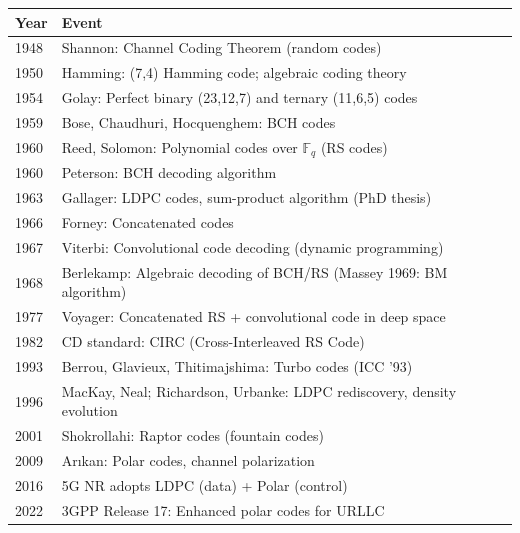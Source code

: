 \begin{tabularx}{\linewidth}{|l|X|}
\hline
\textbf{Year} & \textbf{Event} \\ \hline
1948 & Shannon: Channel Coding Theorem (random codes) \\ \hline
1950 & Hamming: (7,4) Hamming code; algebraic coding theory \\ \hline
1954 & Golay: Perfect binary (23,12,7) and ternary (11,6,5) codes \\ \hline
1959 & Bose, Chaudhuri, Hocquenghem: BCH codes \\ \hline
1960 & Reed, Solomon: Polynomial codes over $\mathbb{F}_q$ (RS codes) \\
 \hline
1960 & Peterson: BCH decoding algorithm \\
 \hline
1963 & Gallager: LDPC codes, sum-product algorithm (PhD thesis) \\
 \hline
1966 & Forney: Concatenated codes \\
 \hline
1967 & Viterbi: Convolutional code decoding (dynamic programming) \\
 \hline
1968 & Berlekamp: Algebraic decoding of BCH/RS (Massey 1969: BM algorithm) \\
 \hline
1977 & Voyager: Concatenated RS + convolutional code in deep space \\
 \hline
1982 & CD standard: CIRC (Cross-Interleaved RS Code) \\
 \hline
1993 & Berrou, Glavieux, Thitimajshima: Turbo codes (ICC '93) \\
 \hline
1996 & MacKay, Neal; Richardson, Urbanke: LDPC rediscovery, density evolution \\
 \hline
2001 & Shokrollahi: Raptor codes (fountain codes) \\
 \hline
2009 & Arıkan: Polar codes, channel polarization \\
 \hline
2016 & 5G NR adopts LDPC (data) + Polar (control) \\
 \hline
2022 & 3GPP Release 17: Enhanced polar codes for URLLC \\
 \hline
\end{tabularx}


